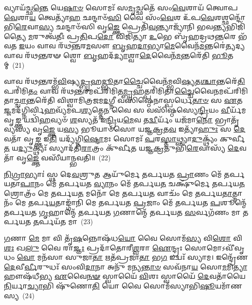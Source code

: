 𑌵𑍍𑌯𑌾𑌯᳴𑌚𑍍𑌛\-\ul{𑌨𑍍𑌤𑍇} 𑌯𑍇\-\ul{𑌷𑌾}\-\-\ul{𑍞} 𑌸𑍋𑌮𑌃᳴ 𑌸\-\ul{𑌮𑍃}\-𑌚𑍍𑌛𑌤𑍇᳴ 𑌸𑌂\-\ul{𑌵𑍇}\-𑌶𑌾𑌯᳴ 𑌤𑍍𑌵𑍋𑌪\-\ul{𑌵𑍇}\-𑌶𑌾\-\ul{𑌯} 𑌤𑍍𑌵𑍇𑌤𑍍𑌯𑌾᳴\-\ul{𑌹} 𑌛𑌨𑍍𑌦𑌾𑍞᳴\-\ul{𑌸𑌿} 𑌵𑍈 𑌸𑌂᳴\-\ul{𑌵𑍇}\-𑌶 𑌉᳴𑌪\-\ul{𑌵𑍇}\-𑌶𑌶𑍍𑌛𑌨𑍍𑌦𑍋᳴𑌭𑌿\-\ul{𑌰𑍇}\-𑌵𑌾\-\ul{𑌸𑍍𑌯} 𑌛𑌨𑍍𑌦𑌾𑍞᳴𑌸𑌿 𑌵𑍃\-\ul{𑌙𑍍𑌕𑍍𑌤𑍇} 𑌪𑍍𑌰𑍇𑌤𑌿᳴\-\ul{𑌵}\-𑌨𑍍𑌤𑍍𑌯𑌾𑌜𑍍𑌯𑌾᳴𑌨𑌿 𑌭𑌵\-\ul{𑌨𑍍𑌤𑍍𑌯}\-𑌭𑌿𑌜𑌿᳴𑌤𑍍𑌯𑍈 \ul{𑌮}\-𑌰𑍁𑌤𑍍𑌵᳴𑌤𑍀𑌃 𑌪𑍍𑌰\-\ul{𑌤𑌿}\-𑌪\-\ul{𑌦𑍋} 𑌵𑌿𑌜𑌿᳴𑌤𑍍𑌯𑌾 \ul{𑌉}\-𑌭𑍇 𑌬𑍃᳴𑌹𑌦𑍍𑌰𑌥\-\ul{𑌨𑍍𑌤}\-𑌰𑍇 𑌭᳴𑌵𑌤 \ul{𑌇}\-𑌯𑌂 𑌵𑌾𑌵 𑌰᳴𑌥\-\ul{𑌨𑍍𑌤}\-𑌰\-\ul{𑌮}\-𑌸𑍗 \ul{𑌬𑍃}\-𑌹\-\ul{𑌦𑌾}\-𑌭𑍍𑌯𑌾\-\ul{𑌮𑍇}\-𑌵𑍈𑌨᳴\-\ul{𑌮}\-𑌨𑍍𑌤𑌰𑍇॑\-\ul{𑌤𑍍𑌯}\-𑌦𑍍𑌯 𑌵𑌾𑌵 𑌰᳴𑌥\-\ul{𑌨𑍍𑌤}\-𑌰𑍟 𑌶𑍍𑌵𑍋 \ul{𑌬𑍃}\-𑌹𑌦᳴\-\ul{𑌦𑍍𑌯𑌾}\-𑌶𑍍𑌵𑌾\-\ul{𑌦𑍇}\-𑌵𑍈𑌨᳴\-\ul{𑌮}\-𑌨𑍍𑌤𑌰𑍇᳴𑌤𑌿 \ul{𑌭𑍂}\-𑌤𑌮𑍍~(21)

𑌵𑌾𑌵 𑌰᳴𑌥\-\ul{𑌨𑍍𑌤}\-𑌰𑌮𑍍𑌭᳴\-\ul{𑌵𑌿}\-𑌷𑍍𑌯\-\ul{𑌦𑍍𑌬𑍃}\-𑌹\-\ul{𑌦𑍍𑌭𑍂}\-𑌤𑌾\-\ul{𑌚𑍍𑌚𑍈}\-𑌵𑍈𑌨᳴𑌮𑍍𑌭𑌵𑌿\-\ul{𑌷𑍍𑌯}\-𑌤\-\ul{𑌶𑍍𑌚𑌾}\-𑌨𑍍𑌤𑌰𑍇᳴\-\ul{𑌤𑌿} 𑌪𑌰𑌿᳴𑌮𑌿\-\ul{𑌤𑌂} 𑌵𑌾𑌵 𑌰᳴𑌥\-\ul{𑌨𑍍𑌤}\-𑌰𑌮𑌪᳴𑌰𑌿𑌮𑌿𑌤\-\ul{𑌮𑍍𑌬𑍃}\-𑌹𑌤𑍍𑌪𑌰𑌿᳴𑌮𑌿𑌤𑌾\-\ul{𑌚𑍍𑌚𑍈}\-𑌵𑍈\-\ul{𑌨}\-𑌮𑌪᳴𑌰𑌿\-𑌮𑌿𑌤𑌾\-\ul{𑌚𑍍𑌚𑌾}\-𑌨𑍍𑌤𑌰𑍇᳴𑌤𑌿 𑌵𑌿𑌶𑍍𑌵𑌾𑌮𑌿𑌤𑍍𑌰𑌜𑌮\-\ul{𑌦}\-𑌗𑍍𑌨𑍀 𑌵𑌸𑌿᳴𑌷𑍍𑌠𑍇𑌨𑌾𑌸𑍍𑌪𑌰𑍍𑌧𑍇\-\ul{𑌤𑌾}\-\-\ul{𑍞} 𑌸 \ul{𑌏}\-𑌤\-\ul{𑌜𑍍𑌜}\-𑌮𑌦᳴𑌗𑍍𑌨𑌿𑌰𑍍𑌵𑌿\-\ul{𑌹}\-𑌵𑍍𑌯᳴𑌮𑌪\-\ul{𑌶𑍍𑌯}\-𑌤𑍍𑌤𑍇\-\ul{𑌨} 𑌵𑍈 𑌸 𑌵𑌸𑌿᳴𑌷𑍍𑌠𑌸𑍍𑌯𑍇\-\ul{𑌨𑍍𑌦𑍍𑌰𑌿}\-𑌯𑌂 \ul{𑌵𑍀}\-𑌰𑍍𑌯᳴𑌮𑌵𑍃\-\ul{𑌙𑍍𑌕𑍍𑌤} 𑌯𑌦𑍍𑌵𑌿᳴\-\ul{𑌹}\-𑌵𑍍𑌯𑍞᳴ \ul{𑌶}\-𑌸𑍍𑌯𑌤᳴ 𑌇\-\ul{𑌨𑍍𑌦𑍍𑌰𑌿}\-𑌯\-\ul{𑌮𑍇}\-𑌵 𑌤\-\ul{𑌦𑍍𑌵𑍀}\-𑌰𑍍𑌯𑌂᳴ 𑌯𑌜᳴𑌮𑌾\-\ul{𑌨𑍋} 𑌭𑍍𑌰𑌾𑌤𑍃᳴𑌵𑍍𑌯𑌸𑍍𑌯 𑌵𑍃\-\ul{𑌙𑍍𑌕𑍍𑌤𑍇} 𑌯\-\ul{𑌸𑍍𑌯} 𑌭𑍂𑌯𑌾𑍞᳴𑌸𑍋 𑌯𑌜𑍍𑌞\-\ul{𑌕𑍍𑌰}\-𑌤\-\ul{𑌵} 𑌇𑌤𑍍𑌯𑌾᳴\-\ul{𑌹𑍁𑌃} 𑌸 \ul{𑌦𑍇}\-𑌵𑌤𑌾᳴ 𑌵𑍃\-\ul{𑌙𑍍𑌕𑍍𑌤} 𑌇\-\ul{𑌤𑌿} 𑌯𑌦𑍍𑌯᳴𑌗𑍍𑌨𑌿\-\ul{𑌷𑍍𑌟𑍋}\-𑌮𑌃 𑌸𑍋𑌮𑌃᳴ \ul{𑌪}\-𑌰\-\ul{𑌸𑍍𑌤𑌾}\-𑌥𑍍𑌸𑍍𑌯𑌾\-\ul{𑌦𑍁}\-𑌕𑍍𑌥𑍍𑌯𑌂᳴ 𑌕𑍁𑌰𑍍𑌵𑍀\-\ul{𑌤} 𑌯\-\ul{𑌦𑍍𑌯𑍁}\-𑌕𑍍𑌥𑍍𑌯𑌃᳴ 𑌸𑍍𑌯𑌾𑌦᳴𑌤𑌿\-\ul{𑌰𑌾}\-𑌤𑍍𑌰𑌂 𑌕𑍁᳴𑌰𑍍𑌵𑍀𑌤 𑌯𑌜𑍍𑌞\-\ul{𑌕𑍍𑌰}\-𑌤𑍁𑌭𑌿᳴\-\ul{𑌰𑍇}\-𑌵𑌾𑌸𑍍𑌯᳴ \ul{𑌦𑍇}\-𑌵𑌤𑌾᳴ 𑌵𑍃\-\ul{𑌙𑍍𑌕𑍍𑌤𑍇} 𑌵𑌸𑍀᳴𑌯𑌾𑌨𑍍𑌭𑌵𑌤𑌿॥~(22)

{\anuvakamend[{\-\ul{𑌪𑍍𑌰𑌾}\-\-\ul{𑌣𑌾}\-\-\ul{𑌪𑌾}\-𑌨𑌯𑍋॑\-\ul{𑌰𑍍𑌭𑍂}\-𑌤𑌂 𑌵𑍃᳴\-\ul{𑌙𑍍𑌕𑍍𑌤𑍇}\-\-𑌽𑌷𑍍𑌟𑌾𑌵𑌿𑍞᳴𑌶𑌤𑌿𑌶𑍍𑌚}]}%

\-\ul{𑌨𑌿}\-\-\ul{𑌗𑍍𑌰𑌾}\-𑌭𑍍𑌯𑌾𑌃॑ 𑌸𑍍𑌥 𑌦𑍇\-\ul{𑌵}\-𑌶𑍍𑌰𑍁\-\ul{𑌤} 𑌆𑌯𑍁᳴𑌰𑍍𑌮𑍇 𑌤𑌰𑍍𑌪𑌯𑌤 \ul{𑌪𑍍𑌰𑌾}\-𑌣𑌂 𑌮𑍇᳴ 𑌤𑌰𑍍𑌪𑌯𑌤𑌾\-\ul{𑌪𑌾}\-𑌨𑌂 𑌮𑍇᳴ 𑌤𑌰𑍍𑌪𑌯𑌤 \ul{𑌵𑍍𑌯𑌾}\-𑌨𑌂 𑌮𑍇᳴ 𑌤𑌰𑍍𑌪𑌯\-\ul{𑌤} 𑌚𑌕𑍍𑌷𑍁᳴𑌰𑍍𑌮𑍇 𑌤𑌰𑍍𑌪𑌯\-\ul{𑌤} 𑌶𑍍𑌰𑍋𑌤𑍍𑌰𑌂᳴ 𑌮𑍇 𑌤𑌰𑍍𑌪𑌯\-\ul{𑌤} 𑌮𑌨𑍋᳴ 𑌮𑍇 𑌤𑌰𑍍𑌪𑌯\-\ul{𑌤} 𑌵𑌾𑌚𑌂᳴ 𑌮𑍇 𑌤𑌰𑍍𑌪𑌯\-\ul{𑌤𑌾}\-𑌤𑍍𑌮𑌾𑌨𑌂᳴ 𑌮𑍇 𑌤𑌰𑍍𑌪\-\ul{𑌯}\-𑌤𑌾𑌙𑍍𑌗𑌾᳴𑌨𑌿 𑌮𑍇 𑌤𑌰𑍍𑌪𑌯𑌤 \ul{𑌪𑍍𑌰}\-𑌜𑌾𑌂 𑌮𑍇᳴ 𑌤𑌰𑍍𑌪𑌯𑌤 \ul{𑌪}\-𑌶𑍂𑌨𑍍𑌮𑍇᳴ 𑌤𑌰𑍍𑌪𑌯𑌤 \ul{𑌗𑍃}\-𑌹𑌾𑌨𑍍𑌮𑍇᳴ 𑌤𑌰𑍍𑌪𑌯𑌤 \ul{𑌗}\-𑌣𑌾𑌨𑍍𑌮𑍇᳴ 𑌤𑌰𑍍𑌪𑌯𑌤 \ul{𑌸}\-𑌰𑍍𑌵𑌗᳴𑌣𑌂 𑌮𑌾 𑌤𑌰𑍍𑌪𑌯𑌤 \ul{𑌤}\-𑌰𑍍𑌪𑌯᳴𑌤 𑌮𑌾~(23)

\-\ul{𑌗}\-𑌣𑌾 \ul{𑌮𑍇} 𑌮𑌾 𑌵𑌿 𑌤𑍃᳴\-\ul{𑌷}\-𑌨𑍍𑌨𑍋𑌷᳴𑌧\-\ul{𑌯𑍋} 𑌵𑍈 𑌸𑍋𑌮᳴\-\ul{𑌸𑍍𑌯} 𑌵𑌿\-\ul{𑌶𑍋} 𑌵𑌿\-\ul{𑌶𑌃} 𑌖\-\ul{𑌲𑍁} 𑌵𑍈 𑌰𑌾\-\ul{𑌜𑍍𑌞𑌃} 𑌪𑍍𑌰𑌦𑌾᳴𑌤𑍋𑌰𑍀\-\ul{𑌶𑍍𑌵}\-𑌰𑌾 \ul{𑌐}\-𑌨𑍍𑌦𑍍𑌰𑌃 𑌸𑍋𑌮𑍋\-𑌽𑌵𑍀᳴𑌵𑍃𑌧𑌂 \ul{𑌵𑍋} 𑌮𑌨᳴𑌸𑌾 𑌸𑍁𑌜𑌾\-\ul{𑌤𑌾} 𑌋𑌤᳴𑌪𑍍𑌰𑌜𑌾\-\ul{𑌤𑌾} 𑌭\-\ul{𑌗} 𑌇𑌦𑍍𑌵𑌃᳴ 𑌸𑍍𑌯𑌾𑌮। 𑌇𑌨𑍍𑌦𑍍𑌰𑍇᳴𑌣 \ul{𑌦𑍇}\-𑌵𑍀\-\ul{𑌰𑍍𑌵𑍀}\-𑌰𑍁𑌧𑌃᳴ 𑌸𑌂𑌵𑌿\-\ul{𑌦𑌾}\-𑌨𑌾 𑌅𑌨𑍁᳴ 𑌮𑌨𑍍𑌯\-\ul{𑌨𑍍𑌤𑌾}\-\-\ul{𑍞} 𑌸𑌵᳴𑌨𑌾\-\ul{𑌯} 𑌸𑍋\-\ul{𑌮}\-𑌮𑌿\-\ul{𑌤𑍍𑌯𑌾}\-𑌹𑍗𑌷᳴𑌧𑍀𑌭𑍍𑌯 \ul{𑌏}\-𑌵𑍈\-\ul{𑌨}\-\-\ul{𑍟} 𑌸𑍍𑌵𑌾𑌯𑍈᳴ \ul{𑌵𑌿}\-𑌶𑌃 𑌸𑍍𑌵𑌾𑌯𑍈᳴ \ul{𑌦𑍇}\-𑌵𑌤𑌾᳴𑌯𑍈 \ul{𑌨𑌿}\-𑌰𑍍𑌯𑌾\-\ul{𑌚𑍍𑌯𑌾}\-𑌭𑌿 𑌷𑍁᳴𑌣𑍋\-\ul{𑌤𑌿} 𑌯𑍋 𑌵𑍈 𑌸𑍋𑌮᳴𑌸𑍍𑌯𑌾𑌭𑌿\-\ul{𑌷𑍂}\-𑌯𑌮𑌾᳴𑌣𑌸𑍍𑌯~(24)

